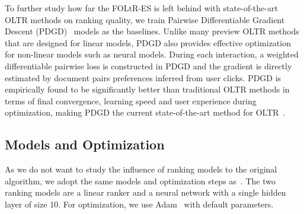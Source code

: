 To further study how far the FOLtR-ES is left behind with state-of-the-art OLTR methods on ranking quality, we train Pairwise Differentiable Gradient Descent (PDGD)~\cite{oosterhuis2018differentiable} models as the baselines. Unlike many preview OLTR methods that are designed for linear models, PDGD also provides effective optimization for non-linear models such as neural models. During each interaction, a weighted differentiable pairwise loss is constructed in PDGD and the gradient is directly estimated by document pairs preferences inferred from user clicks. PDGD is empirically found to be significantly better than traditional OLTR methods in terms of final convergence, learning speed and user experience during optimization, making PDGD the current state-of-the-art method for OLTR~\cite{jagerman2019model,zhuang2020counterfactual}.
 
\subsection{Models and Optimization}
As we do not want to study the influence of ranking models to the original algorithm, we adopt the same models and optimization steps as~\cite{kharitonov2019federated}. The two ranking models are a linear ranker and a neural network with a single hidden layer of size 10. For optimization, we use Adam~\cite{kingma2014adam} with default parameters.

